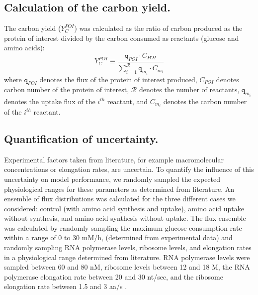 \documentclass[journal=asbcd6,manuscript=article]{achemso}
\begin{document}
\subsection*{Calculation of the carbon yield.}
The carbon yield ($Y_{C}^{POI}$) was calculated as the ratio of carbon produced as the protein of interest divided by the carbon consumed as reactants (glucose and amino acids):
\begin{equation}\label{eqn:yield-definition}
	Y_{C}^{POI}\equiv\frac{\texttt{q}_{POI}\cdot C_{POI}}{\displaystyle\sum_{i=1}^{\mathcal{R}} \texttt{q}_{m_{i}}\cdot C_{m_i}}
\end{equation}
where $\texttt{q}_{POI}$ denotes the flux of the protein of interest produced, $C_{POI}$ denotes carbon number of the protein of interest, $\mathcal{R}$ denotes the number of reactants,
$\texttt{q}_{m_{i}}$ denotes the uptake flux of the $i^{th}$ reactant, and $C_{m_i}$ denotes the carbon number of the $i^{th}$ reactant.


\subsection*{Quantification of uncertainty.}
Experimental factors taken from literature, for example macromolecular concentrations or elongation rates, are uncertain.
To quantify the influence of this uncertainty on model performance, we randomly sampled the expected physiological ranges for these parameters as determined from literature.
An ensemble of flux distributions was calculated for the three different cases we considered:
control (with amino acid synthesis and uptake), amino acid uptake without synthesis, and amino acid synthesis without uptake.
The flux ensemble was calculated by randomly sampling the maximum glucose consumption rate within a range of 0 to 30 mM/h, (determined from experimental data)
and randomly sampling RNA polymerase levels, ribosome levels, and elongation rates in a physiological range determined from literature.
RNA polymerase levels were sampled between 60 and 80 nM, ribosome levels between 12 and 18 \textmu M, the RNA polymerase elongation rate between 20 and 30 nt/sec, and the ribosome elongation rate between 1.5 and 3 aa/s \cite{2005_underwood_biotech, Garamella:2016aa}.
\end{document}
